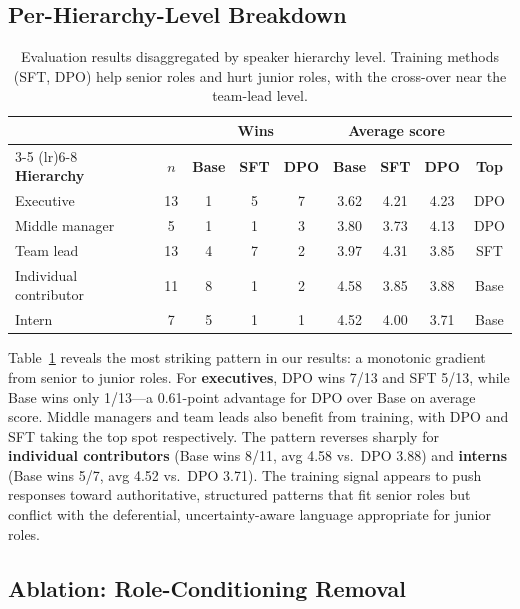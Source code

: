 \documentclass{article}
\begin{document}
\subsection{Per-Hierarchy-Level Breakdown}

\begin{table}[t]
\caption{Evaluation results disaggregated by speaker hierarchy level. Training methods (SFT, DPO) help senior roles and hurt junior roles, with the cross-over near the team-lead level.}
\label{tab:hierarchy}
\begin{center}
\small
\begin{tabular}{lcccccccc}
\toprule
& & \multicolumn{3}{c}{\textbf{Wins}} & \multicolumn{3}{c}{\textbf{Average score}} & \\
\cmidrule(lr){3-5} \cmidrule(lr){6-8}
\textbf{Hierarchy} & $n$ & \textbf{Base} & \textbf{SFT} & \textbf{DPO} & \textbf{Base} & \textbf{SFT} & \textbf{DPO} & \textbf{Top} \\
\midrule
Executive & 13 & 1 & 5 & 7 & 3.62 & 4.21 & 4.23 & DPO \\
Middle manager & 5 & 1 & 1 & 3 & 3.80 & 3.73 & 4.13 & DPO \\
Team lead & 13 & 4 & 7 & 2 & 3.97 & 4.31 & 3.85 & SFT \\
Individual contributor & 11 & 8 & 1 & 2 & 4.58 & 3.85 & 3.88 & Base \\
Intern & 7 & 5 & 1 & 1 & 4.52 & 4.00 & 3.71 & Base \\
\bottomrule
\end{tabular}
\end{center}
\end{table}

Table~\ref{tab:hierarchy} reveals the most striking pattern in our results: a monotonic gradient from senior to junior roles. For \textbf{executives}, DPO wins 7/13 and SFT 5/13, while Base wins only 1/13---a 0.61-point advantage for DPO over Base on average score. Middle managers and team leads also benefit from training, with DPO and SFT taking the top spot respectively. The pattern reverses sharply for \textbf{individual contributors} (Base wins 8/11, avg 4.58 vs.\ DPO 3.88) and \textbf{interns} (Base wins 5/7, avg 4.52 vs.\ DPO 3.71). The training signal appears to push responses toward authoritative, structured patterns that fit senior roles but conflict with the deferential, uncertainty-aware language appropriate for junior roles.

\subsection{Ablation: Role-Conditioning Removal}
\label{sec:ablation}
\end{document}
